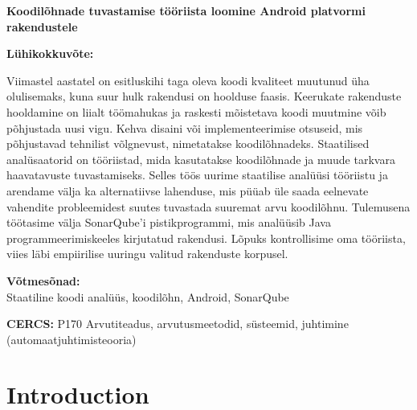 \documentclass[12pt]{article}
\begin{document}
    \newcommand\EstInfo{{%
    \selectlanguage{estonian}
    \noindent\textbf{\large Koodilõhnade tuvastamise tööriista loomine Android platvormi rakendustele}
    \vspace*{1ex}

    \noindent\textbf{Lühikokkuvõte:}

    \noident
    Viimastel aastatel on esitluskihi taga oleva koodi kvaliteet muutunud üha olulisemaks, kuna suur hulk rakendusi on hoolduse faasis.
    Keerukate rakenduste hooldamine on liialt töömahukas ja raskesti mõistetava koodi muutmine võib põhjustada uusi vigu.
    Kehva disaini või implementeerimise otsuseid, mis põhjustavad tehnilist võlgnevust, nimetatakse koodilõhnadeks.
    Staatilised analüsaatorid on tööriistad, mida kasutatakse koodilõhnade ja muude tarkvara haavatavuste tuvastamiseks.
    Selles töös uurime staatilise analüüsi tööriistu ja arendame välja ka alternatiivse lahenduse,
    mis püüab üle saada eelnevate vahendite probleemidest suutes tuvastada suuremat arvu koodilõhnu.
    Tulemusena töötasime välja SonarQube'i pistikprogrammi, mis analüüsib Java programmeerimiskeeles kirjutatud rakendusi.
    Lõpuks kontrollisime oma tööriista, viies läbi empiirilise uuringu valitud rakenduste korpusel.

    \vspace*{1ex}

    \noindent\textbf{Võtmesõnad:}\\
    Staatiline koodi analüüs, koodilõhn, Android, SonarQube

    \vspace*{1ex}

    \noindent\textbf{CERCS:} P170 Arvutiteadus, arvutusmeetodid, süsteemid, juhtimine (automaatjuhtimisteooria)

    \vspace*{1ex}
    }}%


    \EngInfo

    \newpage
    \EstInfo


    \newpage
    \tableofcontents

    \newpage

    \section{Introduction}\label{sec:introduction}

    
\end{document}
